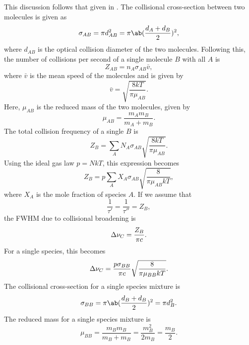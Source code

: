 This discussion follows that given in \cite[134]{hansonSpectroscopyOpticalDiagnostics2016}.
The collisional cross-section between two molecules is given as
\begin{equation*}
    \sigma_{AB} = \pi d_{AB}^2 = \pi\ab(\frac{d_A + d_B}{2})^2,
\end{equation*}
where $d_{AB}$ is the optical collision diameter of the two molecules.
Following this, the number of collisions per second of a single molecule $B$ with all $A$ is
\begin{equation*}
    Z_{AB} = n_A\sigma_{AB}\bar{v},
\end{equation*}
where $\bar{v}$ is the mean speed of the molecules and is given by
\begin{equation*}
    \bar{v} = \sqrt{\frac{8kT}{\pi\mu_{AB}}}.
\end{equation*}
Here, $\mu_{AB}$ is the reduced mass of the two molecules, given by
\begin{equation*}
    \mu_{AB} = \frac{m_Am_B}{m_A + m_B}.
\end{equation*}
The total collision frequency of a single $B$ is
\begin{equation*}
    Z_B = \sum_AN_A\sigma_{AB}\sqrt{\frac{8kT}{\pi\mu_{AB}}}.
\end{equation*}
Using the ideal gas law $p = NkT$, this expression becomes
\begin{equation*}
    Z_B = p\sum_AX_A\sigma_{AB}\sqrt{\frac{8}{\pi\mu_{AB}kT}},
\end{equation*}
where $X_A$ is the mole fraction of species $A$. If we assume that
\begin{equation*}
    \frac{1}{\tau'} = \frac{1}{\tau''} = Z_B,
\end{equation*}
the FWHM due to collisional broadening is
\begin{equation*}
    \adif{\nu}_C = \frac{Z_B}{\pi c}.
\end{equation*}
For a single species, this becomes
\begin{equation*}
    \adif{\nu}_C = \frac{p\sigma_{BB}}{\pi c}\sqrt{\frac{8}{\pi\mu_{BB}kT}}.
\end{equation*}
The collisional cross-section for a single species mixture is
\begin{equation*}
    \sigma_{BB} = \pi\ab(\frac{d_B + d_B}{2})^2 = \pi d_B^2.
\end{equation*}
The reduced mass for a single species mixture is
\begin{equation*}
    \mu_{BB} = \frac{m_Bm_B}{m_B + m_B} = \frac{m_B^2}{2m_B} = \frac{m_B}{2}.
\end{equation*}

